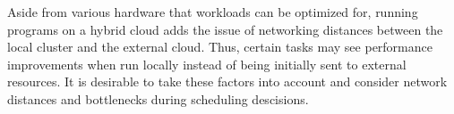 \begin{description}[style=nextline]
    \item [Location Optimized Scheduling]
    Aside from various hardware that workloads can be optimized for, running programs on a hybrid cloud adds the issue of networking distances between the local cluster and the external cloud. Thus, certain tasks may see performance improvements when run locally instead of being initially sent to external resources. It is desirable to take these factors into account and consider network distances and bottlenecks during scheduling descisions.

\end{description}
